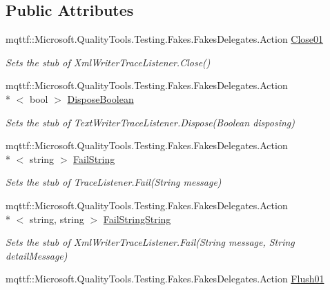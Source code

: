 \subsection*{Public Attributes}
\begin{DoxyCompactItemize}
\item 
mqttf\-::\-Microsoft.\-Quality\-Tools.\-Testing.\-Fakes.\-Fakes\-Delegates.\-Action \hyperlink{class_system_1_1_diagnostics_1_1_fakes_1_1_stub_xml_writer_trace_listener_a513d9d1bfa7b2157c0c9e3e80cacd2f7}{Close01}
\begin{DoxyCompactList}\small\item\em Sets the stub of Xml\-Writer\-Trace\-Listener.\-Close()\end{DoxyCompactList}\item 
mqttf\-::\-Microsoft.\-Quality\-Tools.\-Testing.\-Fakes.\-Fakes\-Delegates.\-Action\\*
$<$ bool $>$ \hyperlink{class_system_1_1_diagnostics_1_1_fakes_1_1_stub_xml_writer_trace_listener_a7df633a59cdc8d496e40b0170d34ce55}{Dispose\-Boolean}
\begin{DoxyCompactList}\small\item\em Sets the stub of Text\-Writer\-Trace\-Listener.\-Dispose(\-Boolean disposing)\end{DoxyCompactList}\item 
mqttf\-::\-Microsoft.\-Quality\-Tools.\-Testing.\-Fakes.\-Fakes\-Delegates.\-Action\\*
$<$ string $>$ \hyperlink{class_system_1_1_diagnostics_1_1_fakes_1_1_stub_xml_writer_trace_listener_a11184b312a8e5a6f45379854caa6bf32}{Fail\-String}
\begin{DoxyCompactList}\small\item\em Sets the stub of Trace\-Listener.\-Fail(\-String message)\end{DoxyCompactList}\item 
mqttf\-::\-Microsoft.\-Quality\-Tools.\-Testing.\-Fakes.\-Fakes\-Delegates.\-Action\\*
$<$ string, string $>$ \hyperlink{class_system_1_1_diagnostics_1_1_fakes_1_1_stub_xml_writer_trace_listener_a214c4ac86cc8cbfef96cecbb4ec44b9f}{Fail\-String\-String}
\begin{DoxyCompactList}\small\item\em Sets the stub of Xml\-Writer\-Trace\-Listener.\-Fail(\-String message, String detail\-Message)\end{DoxyCompactList}\item 
mqttf\-::\-Microsoft.\-Quality\-Tools.\-Testing.\-Fakes.\-Fakes\-Delegates.\-Action \hyperlink{class_system_1_1_diagnostics_1_1_fakes_1_1_stub_xml_writer_trace_listener_a613872e2ef5fd38f998c847377efe4d3}{Flush01}

\end{DoxyCompactItemize}
